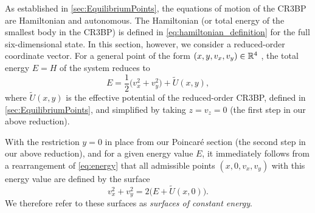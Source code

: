     As established in \cref{sec:EquilibriumPoints}, the equations of motion of the CR$3$BP are Hamiltonian and autonomous. The Hamiltonian (or total energy of the smallest body in the CR$3$BP) is defined in \cref{eq:hamiltonian_definition} for the full six-dimensional state. In this section, however, we consider a reduced-order coordinate vector. For a general point of the form $(x,y,v_x,v_y) \in \mathbb{R}^4$ , the total energy $E = H$ of the system reduces to
    \begin{equation} \label{eq:energy}
    	E = \frac{1}{2} \bigl( v_x^2 + v_y^2 \bigr) + \tilde U(x,y),
    \end{equation}
    where $\tilde U(x,y)$ is the effective potential of the reduced-order CR$3$BP, defined in \cref{sec:EquilibriumPoints}, and simplified by taking $z= v_z = 0$ (the first step in our above reduction).


    
    With the restriction $y=0$ in place from our Poincaré section (the second step in our above reduction), and for a given energy value $E$, it immediately follows from a rearrangement of \cref{eq:energy} that all admissible points $(x,0,v_x,v_y)$ with this energy value are defined by the surface
    \begin{equation} \label{eq:ConstantEnergySurface}
        v_x^2 + v_y^2 = 2\bigl( E + \tilde U(x,0) \bigr).
    \end{equation}
    We therefore refer to these surfaces as \textit{surfaces of constant energy}.



